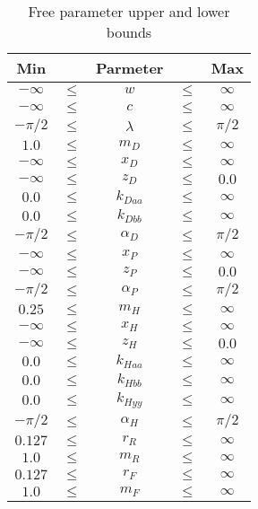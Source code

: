 \documentclass{bmd2019a}
\begin{document}
\begin{table}
  \caption{Free parameter upper and lower bounds}
  \label{tab:bounds}
  \centering
  \begin{tabular}{ccccc}
    \toprule
    Min & & Parmeter & & Max\\
    \midrule
    $-\infty$ & $\leq$ & $w       $  &  $\leq$  &  $\infty$ \\
    $-\infty$ & $\leq$ & $c       $  &  $\leq$  &  $\infty$ \\
    $-\pi/2 $ & $\leq$ & $\lambda $  &  $\leq$  &  $\pi/2$ \\
    $1.0    $ & $\leq$ & $m_D     $  &  $\leq$  &  $\infty$ \\
    $-\infty$ & $\leq$ & $x_D     $  &  $\leq$  &  $\infty$ \\
    $-\infty$ & $\leq$ & $z_D     $  &  $\leq$  &  $0.0$    \\
    $0.0    $ & $\leq$ & $k_{Daa} $  &  $\leq$  &  $\infty$ \\
    $0.0    $ & $\leq$ & $k_{Dbb} $  &  $\leq$  &  $\infty$ \\
    $-\pi/2 $ & $\leq$ & $\alpha_D$  &  $\leq$  &  $\pi/2$  \\
    $-\infty$ & $\leq$ & $x_P     $  &  $\leq$  &  $\infty$ \\
    $-\infty$ & $\leq$ & $z_P     $  &  $\leq$  &  $0.0$    \\
    $-\pi/2 $ & $\leq$ & $\alpha_P$  &  $\leq$  &  $\pi/2$ \\
    $0.25   $ & $\leq$ & $m_H     $  &  $\leq$  &  $\infty$ \\
    $-\infty$ & $\leq$ & $x_H     $  &  $\leq$  &  $\infty$ \\
    $-\infty$ & $\leq$ & $z_H     $  &  $\leq$  &  $0.0$ \\
    $0.0    $ & $\leq$ & $k_{Haa} $  &  $\leq$  &  $\infty$ \\
    $0.0    $ & $\leq$ & $k_{Hbb} $  &  $\leq$  &  $\infty$ \\
    $0.0    $ & $\leq$ & $k_{Hyy} $  &  $\leq$  &  $\infty$ \\
    $-\pi/2 $ & $\leq$ & $\alpha_H$  &  $\leq$  &  $\pi/2$ \\
    $0.127  $ & $\leq$ & $r_R     $  &  $\leq$  &  $\infty$ \\
    $1.0    $ & $\leq$ & $m_R     $  &  $\leq$  &  $\infty$ \\
    $0.127  $ & $\leq$ & $r_F     $  &  $\leq$  &  $\infty$ \\
    $1.0    $ & $\leq$ & $m_F     $  &  $\leq$  &  $\infty$ \\
    \bottomrule
  \end{tabular}
\end{table}
\end{document}
